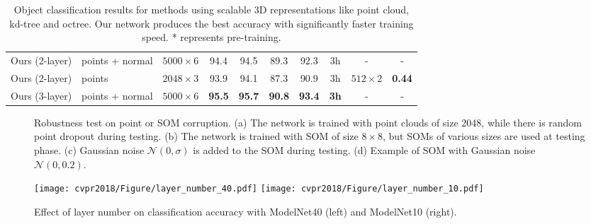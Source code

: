 \documentclass[10pt,twocolumn,letterpaper]{article}
\begin{document}
\begin{table*}[t]
{\begin{tabular}{ll||c|cc|ccc||cc}
Ours (2-layer)          & points + normal                 & $5000\times 6$                   & 94.4          & 94.5            & 89.3  & 92.3     & 3h            & -           & -            \\
Ours (2-layer)          & points                          & $2048\times 3$                   & 93.9          & 94.1            & 87.3  & 90.9     & 3h            & $512\times 2$            & \textbf{0.44}            \\ \hline
Ours (3-layer)          & points + normal                 & $5000\times 6$                   & \textbf{95.5} & \textbf{95.7}   & \textbf{90.8} & \textbf{93.4}     & \textbf{3h}            & -      & -         \\
\hline
\end{tabular}
}
\caption{Object classification results for methods using scalable 3D representations like point cloud, kd-tree and octree. Our network produces the best accuracy with significantly faster training speed. * represents pre-training.}
\vspace{-4pt}
\label{tbl_cls}
\end{table*}


\begin{figure*}[h!] 
        \centering
        \caption{Robustness test on point or SOM corruption. (a) The network is trained with point clouds of size 2048, while there is random point dropout during testing. (b) The network is trained with SOM of size $8\times 8$, but SOMs of various sizes are used at testing phase. (c) Gaussian noise $\mathcal{N}(0, \sigma)$ is added to the SOM during testing. (d) Example of SOM with Gaussian noise $\mathcal{N}(0, 0.2)$.} \label{fig_cls_robustness}
        \vspace{-4pt}
\end{figure*}
%
%
\begin{figure}[t] 
        \centering
        \texttt{[image: cvpr2018/Figure/layer\_number\_40.pdf]}
        \texttt{[image: cvpr2018/Figure/layer\_number\_10.pdf]}
        \caption{Effect of layer number on classification accuracy with ModelNet40 (left) and ModelNet10 (right).}
        \label{fig_layer_number}
        \vspace{-12pt}
\end{figure}
\end{document}
